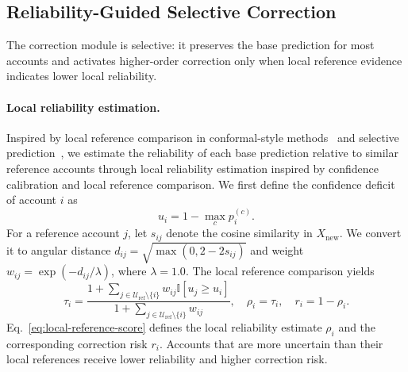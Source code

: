 \subsection{Reliability-Guided Selective Correction}

The correction module is selective: it preserves the base prediction for most accounts and activates higher-order correction only when local reference evidence indicates lower local reliability.

\paragraph{Local reliability estimation.}
Inspired by local reference comparison in conformal-style methods~\cite{vovk2005algorithmic} and selective prediction~\cite{geifman2017selective}, we estimate the reliability of each base prediction relative to similar reference accounts through local reliability estimation inspired by confidence calibration and local reference comparison. We first define the confidence deficit of account $i$ as
\begin{equation}
u_i=1-\max_c p_i^{(c)}.
\label{eq:confidence-deficit}
\end{equation}
For a reference account $j$, let $s_{ij}$ denote the cosine similarity in $X_{\mathrm{new}}$. We convert it to angular distance $d_{ij}=\sqrt{\max(0,2-2s_{ij})}$ and weight $w_{ij}=\exp(-d_{ij}/\lambda)$, where $\lambda=1.0$. The local reference comparison yields
\begin{equation}
\tau_i =
    \frac{1+\sum_{j\in\mathcal{U}_{\mathrm{ref}}\setminus\{i\}} w_{ij}\mathbb{I}[u_j\ge u_i]}
         {1+\sum_{j\in\mathcal{U}_{\mathrm{ref}}\setminus\{i\}} w_{ij}},
\quad
\rho_i = \tau_i,
\quad
r_i = 1-\rho_i .
\label{eq:local-reference-score}
\end{equation}
Eq.~\eqref{eq:local-reference-score} defines the local reliability estimate $\rho_i$ and the corresponding correction risk $r_i$. Accounts that are more uncertain than their local references receive lower reliability and higher correction risk.

